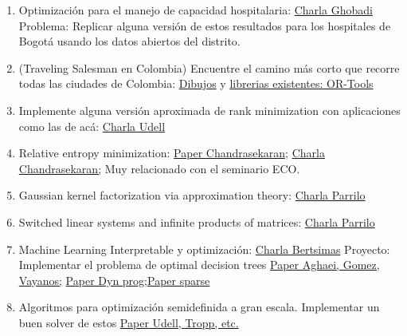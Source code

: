 \documentclass[12pt, a4paper]{article}
\begin{document}
\begin{enumerate}
\item Optimizaci\'on para el manejo de capacidad hospitalaria:
\href{https://www.gurobi.com/resource/covid-19-hospital-capacity-management/}{Charla Ghobadi}\\
Problema: Replicar alguna versi\'on de estos resultados para los hospitales de Bogot\'a usando los datos abiertos del distrito.
\item (Traveling Salesman en Colombia) Encuentre el camino m\'as corto que recorre todas las ciudades de Colombia: 
\href{https://www2.oberlin.edu/math/faculty/bosch/tspart-page.html}{Dibujos}
y  
\href{https://developers.google.com/optimization/routing/tsp}{librerias existentes: OR-Tools}
\item  Implemente alguna versi\'on aproximada de rank minimization con aplicaciones como las de ac\'a:
\href{https://www.youtube.com/watch?v=QMybSG5vOgE}{Charla Udell}
\item{Relative entropy minimization: \href{http://users.cms.caltech.edu/~venkatc/cs_rep_mathprog17.pdf}{Paper Chandrasekaran;} 
\href{https://www.youtube.com/watch?v=vUPcyENTbGA}{Charla Chandrasekaran;}
Muy relacionado con el seminario ECO.
}
\item Gaussian kernel factorization via approximation theory:
\href{https://www.youtube.com/watch?v=83R63nfYgJM}{Charla Parrilo}
\item  Switched linear systems and infinite products of matrices:
\href{https://www.youtube.com/watch?v=V71STrm_YyM}{Charla Parrilo}
\item Machine Learning Interpretable y optimizaci\'on: \href{https://www.gurobi.com/resource/develop-more-accurate-machine-learning-models-with-mip/}{Charla Bertsimas}
Proyecto: Implementar el problema de optimal decision trees \href{https://arxiv.org/pdf/2103.15965.pdf}{Paper Aghaei, Gomez, Vayanos;} \href{https://arxiv.org/abs/2007.12652}{Paper Dyn prog;}\href{https://arxiv.org/abs/1904.12847}{Paper sparse}


\item{Algoritmos para optimizaci\'on semidefinida a gran escala. Implementar un buen solver de estos} \href{https://arxiv.org/pdf/1912.02949.pdf}{Paper Udell, Tropp, etc.}

\end{enumerate}


 
\end{document}
